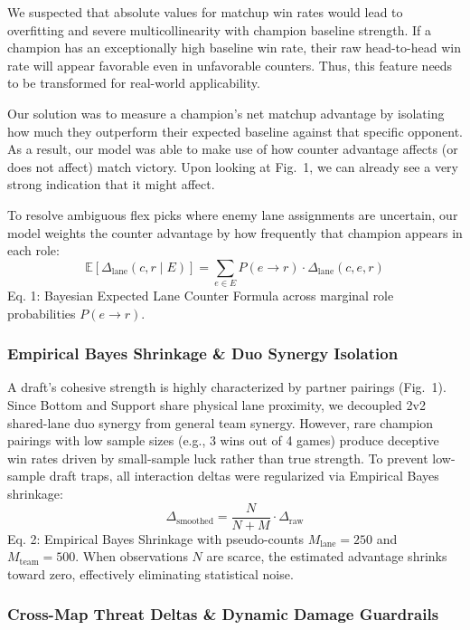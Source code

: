 \documentclass[11pt,letterpaper]{article}
\begin{document}
We suspected that absolute values for matchup win rates would lead to overfitting and severe multicollinearity with champion baseline strength. If a champion has an exceptionally high baseline win rate, their raw head-to-head win rate will appear favorable even in unfavorable counters. Thus, this feature needs to be transformed for real-world applicability.

Our solution was to measure a champion's net matchup advantage by isolating how much they outperform their expected baseline against that specific opponent. As a result, our model was able to make use of how counter advantage affects (or does not affect) match victory. Upon looking at Fig.~1, we can already see a very strong indication that it might affect.

To resolve ambiguous flex picks where enemy lane assignments are uncertain, our model weights the counter advantage by how frequently that champion appears in each role:
\begin{equation}
\mathbb{E}[\Delta_{\text{lane}}(c, r \mid E)] = \sum_{e \in E} P(e \to r) \cdot \Delta_{\text{lane}}(c, e, r)
\end{equation}
Eq. 1: Bayesian Expected Lane Counter Formula across marginal role probabilities $P(e \to r)$.

\subsubsection{Empirical Bayes Shrinkage \& Duo Synergy Isolation}

A draft's cohesive strength is highly characterized by partner pairings (Fig.~1). Since Bottom and Support share physical lane proximity, we decoupled 2v2 shared-lane duo synergy from general team synergy. However, rare champion pairings with low sample sizes (e.g., 3 wins out of 4 games) produce deceptive win rates driven by small-sample luck rather than true strength. To prevent low-sample draft traps, all interaction deltas were regularized via Empirical Bayes shrinkage:
\begin{equation}
\Delta_{\text{smoothed}} = \frac{N}{N + M} \cdot \Delta_{\text{raw}}
\end{equation}
Eq. 2: Empirical Bayes Shrinkage with pseudo-counts $M_{\text{lane}} = 250$ and $M_{\text{team}} = 500$. When observations $N$ are scarce, the estimated advantage shrinks toward zero, effectively eliminating statistical noise.

\subsubsection{Cross-Map Threat Deltas \& Dynamic Damage Guardrails}
\end{document}
